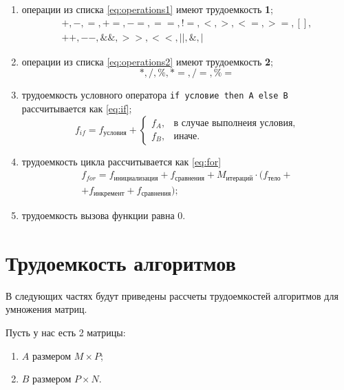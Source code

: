 \begin{enumerate}
	\item операции из списка \ref{eq:operations1} имеют трудоемкость \textbf{1};
	\begin{equation}
		\label{eq:operations1}
		\begin{gathered}
			+, -, =, +=, -=, ==, !=, <, >, <=, >=, [], \\ ++, --, \&\&, >>, <<, ||, \&, |
		\end{gathered}
	\end{equation}
	\item операции из списка \ref{eq:operations2} имеют трудоемкость \textbf{2};
	\begin{equation}
		\label{eq:operations2}
		*, /, \%, *=, /=, \%=
	\end{equation}
	\item трудоемкость условного оператора \texttt{if условие then A else B} рассчитывается как \ref{eq:if};
	\begin{equation}
		\label{eq:if}
		f_{if} = f_{\text{условия}} + 
		\begin{cases}
			f_{A}, & \text{в случае выполнеия условия,}\\
			f_{B}, & \text{иначе}.
		\end{cases}
	\end{equation}
	\item трудоемкость цикла рассчитывается как \ref{eq:for}
	\begin{equation}
		\label{eq:for}
		\begin{gathered}
			f_{for} = f_{\text{инициализация}} + f_{\text{сравнения}} + M_{\text{итераций}} \cdot (f_{\text{тело}} +\\
			+ f_{\text{инкремент}} + f_{\text{сравнения}});
		\end{gathered}
	\end{equation}
	\item трудоемкость вызова функции равна 0.
\end{enumerate}

\section{Трудоемкость алгоритмов}
В следующих частях будут приведены рассчеты трудоемкостей алгоритмов для умножения матриц.

Пусть у нас есть 2 матрицы: 
\begin{enumerate}
	\item $A$ размером $M \times P$;
	\item $B$ размером $P \times N$.
\end{enumerate}

